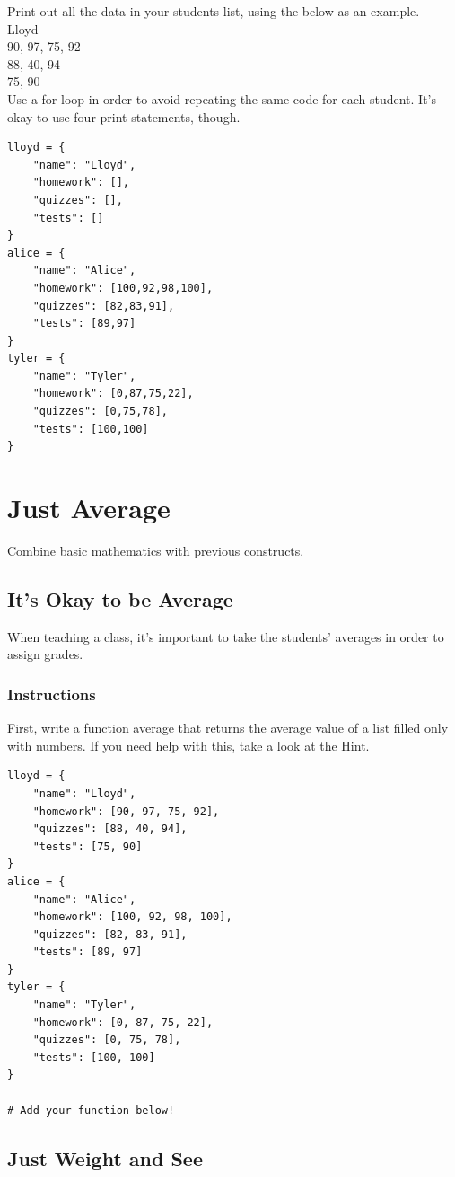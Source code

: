 \documentclass[12pt,a4paper,final,twoside,onecolumn,titlepage]{book}
\begin{document}
Print out all the data in your students list, using the below as an example.
\\
Lloyd\\
90, 97, 75, 92\\
88, 40, 94\\
75, 90\\

Use a for loop in order to avoid repeating the same code for each student. It's okay to use four print statements, though.
\begin{lstlisting}
lloyd = {
    "name": "Lloyd",
    "homework": [],
    "quizzes": [],
    "tests": []
}
alice = {
    "name": "Alice",
    "homework": [100,92,98,100],
    "quizzes": [82,83,91],
    "tests": [89,97]
}
tyler = {
    "name": "Tyler",
    "homework": [0,87,75,22],
    "quizzes": [0,75,78],
    "tests": [100,100]
}
\end{lstlisting}


\section{Just Average}
Combine basic mathematics with previous constructs.
\subsection{It's Okay to be Average}

When teaching a class, it's important to take the students' averages in order to assign grades.
\subsubsection{Instructions}

First, write a function average that returns the average value of a list filled only with numbers. If you need help with this, take a look at the Hint.
\begin{lstlisting}
lloyd = {
    "name": "Lloyd",
    "homework": [90, 97, 75, 92],
    "quizzes": [88, 40, 94],
    "tests": [75, 90]
}
alice = {
    "name": "Alice",
    "homework": [100, 92, 98, 100],
    "quizzes": [82, 83, 91],
    "tests": [89, 97]
}
tyler = {
    "name": "Tyler",
    "homework": [0, 87, 75, 22],
    "quizzes": [0, 75, 78],
    "tests": [100, 100]
}

# Add your function below!

\end{lstlisting}
\subsection{Just Weight and See}
\end{document}
